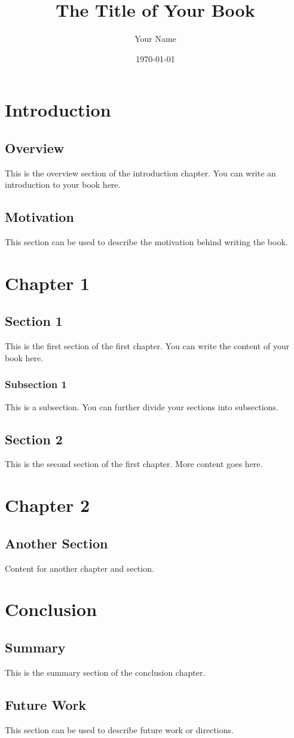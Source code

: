 \documentclass[12pt]{book}
\title{The Title of Your Book}
\author{Your Name}
\date{\today}
\begin{document}
\maketitle

\tableofcontents

\chapter{Introduction}
\section{Overview}
This is the overview section of the introduction chapter. You can write an introduction to your book here.

\section{Motivation}
This section can be used to describe the motivation behind writing the book.

\chapter{Chapter 1}
\section{Section 1}
This is the first section of the first chapter. You can write the content of your book here.

\subsection{Subsection 1}
This is a subsection. You can further divide your sections into subsections.

\section{Section 2}
This is the second section of the first chapter. More content goes here.

\chapter{Chapter 2}
\section{Another Section}
Content for another chapter and section.

\chapter{Conclusion}
\section{Summary}
This is the summary section of the conclusion chapter.

\section{Future Work}
This section can be used to describe future work or directions.
\end{document}
